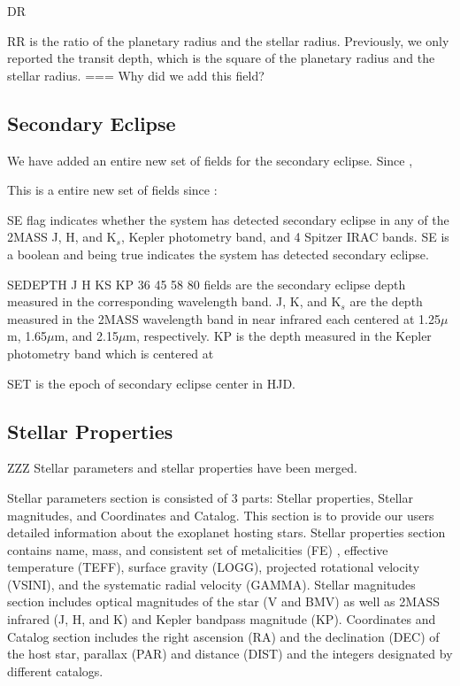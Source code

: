 \documentclass[11pt,preprint]{aastex}
\def\micron{$\mu$m}
\def\micron{$\mu$m}
\begin{document}
\begin{CJK*}{UTF8}{gbsn}
DR

RR is the ratio of the planetary radius and the stellar radius. Previously, we only reported the transit depth, which is the square of the planetary radius and the stellar radius.
=== Why did we add this field? 

\subsection{Secondary Eclipse}
We have added an entire new set of fields for the secondary eclipse. Since \cite{Wright2011}, 

This is a entire new set of fields since \cite{Wright2011}:

SE flag indicates whether the system has detected secondary eclipse in any of the 2MASS J, H, and K$_s$, Kepler photometry band, and 4 Spitzer IRAC bands. SE is a boolean and being true indicates the system has detected secondary eclipse. 

SEDEPTH J H KS KP 36 45 58 80 fields are the secondary eclipse depth measured in the corresponding wavelength band. J, K, and K$_s$ are the depth measured in the 2MASS wavelength band in near infrared each centered at 1.25\micron, 1.65\micron, and 2.15\micron, respectively. KP is the depth measured in the Kepler photometry band which is centered at 

SET is the epoch of secondary eclipse center in HJD. 


\subsection{Stellar Properties}
ZZZ Stellar parameters and stellar properties have been merged. 

Stellar parameters section is consisted of 3 parts: Stellar properties, Stellar magnitudes, and Coordinates and Catalog. This section is to provide our users detailed information about the exoplanet hosting stars. Stellar properties section contains name, mass, and consistent set of metalicities (FE) , effective temperature (TEFF), surface gravity (LOGG), projected rotational velocity (VSINI), and the systematic radial velocity (GAMMA). Stellar magnitudes section includes optical magnitudes of the star (V and BMV) as well as 2MASS infrared (J, H, and K) and Kepler bandpass magnitude (KP). Coordinates and Catalog section includes the right ascension (RA) and the declination (DEC) of the host star, parallax (PAR) and distance (DIST) and the integers designated by different catalogs. 


\end{CJK*}
\end{document}
